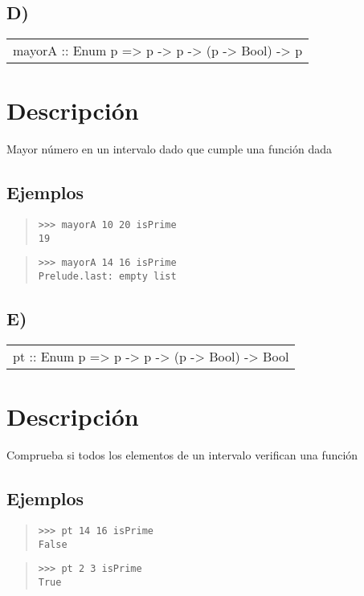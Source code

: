 \subsection{D)}
\begin{haddockdesc}
\item[\begin{tabular}{@{}l}
mayorA :: Enum p => p -> p -> (p -> Bool) -> p
\end{tabular}]
{\haddockbegindoc
\section*{Descripción}
Mayor número en un intervalo dado que cumple una función dada\par
\subsection*{Ejemplos}
\begin{quote}
{\haddockverb\begin{verbatim}
>>> mayorA 10 20 isPrime
19

\end{verbatim}}
\end{quote}
\begin{quote}
{\haddockverb\begin{verbatim}
>>> mayorA 14 16 isPrime
Prelude.last: empty list

\end{verbatim}}
\end{quote}}
\end{haddockdesc}
\subsection{E)}
\begin{haddockdesc}
\item[\begin{tabular}{@{}l}
pt :: Enum p => p -> p -> (p -> Bool) -> Bool
\end{tabular}]
{\haddockbegindoc
\section*{Descripción}
Comprueba si todos los elementos de un intervalo verifican una función\par
\subsection*{Ejemplos}
\begin{quote}
{\haddockverb\begin{verbatim}
>>> pt 14 16 isPrime
False

\end{verbatim}}
\end{quote}
\begin{quote}
{\haddockverb\begin{verbatim}
>>> pt 2 3 isPrime
True

\end{verbatim}}
\end{quote}}
\end{haddockdesc}
